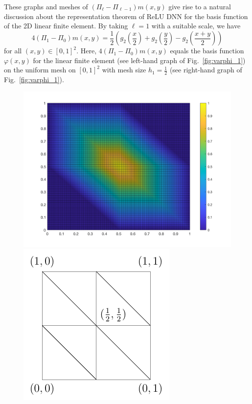 These graphs and meshes of $(\Pi_\ell - \Pi_{\ell-1})m(x,y)$ give rise to a natural discussion about
the representation theorem of ReLU DNN for the basis function of the 2D linear finite element.
By taking $\ell=1$ with a suitable scale, we have
\begin{equation}\label{eq:varphi_1}
	4(\Pi_1- \Pi_{0})m (x,y) 
	= \frac{1}{2}\left(g_{2}\left(\frac{x}{2}\right)+g_2\left(\frac{y}{2}\right)-g_2\left(\frac{x+y}{2}\right)\right)
\end{equation}
for all $ (x,y) \in [0,1]^2$. 
Here, $4(\Pi_1- \Pi_{0})m (x,y)$ equals the basis function $\varphi(x,y)$ for the 
linear finite element (see left-hand graph of Fig.~\ref{fig:varphi_1}) 
on the uniform mesh on $[0,1]^2$ with mesh size $h_1=\frac{1}{2}$ (see right-hand graph of Fig.~\ref{fig:varphi_1}).
\begin{figure}[h!]
	\begin{minipage}[t]{0.43\linewidth}
		\centering
		\includegraphics[width=\textwidth]{6DL/figures/varphi}
	\end{minipage}
	\begin{minipage}[t]{0.45\linewidth}
		\centering
		\includegraphics[scale=.5]{6DL/figures/2D_Basis}

\end{minipage}
\end{figure}
